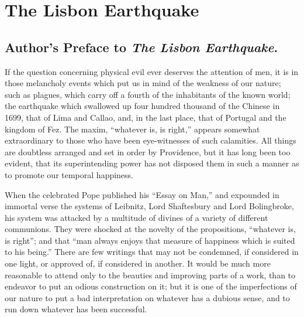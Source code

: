 
\author{Voltaire}
\chapter{The Lisbon Earthquake}

\section*{Author's Preface to \emph{The Lisbon Earthquake}.}

If the question concerning physical evil ever deserves the attention
of men, it is in those melancholy events which put us in mind of the
weakness of our nature; such as plagues, which carry off a fourth of
the inhabitants of the known world; the earthquake which swallowed up
four hundred thousand of the Chinese in 1699, that of Lima and Callao,
and, in the last place, that of Portugal and the kingdom of Fez. The
maxim, ``whatever is, is right,'' appears somewhat extraordinary to
those who have been eye-witnesses of such calamities. All things are
doubtless arranged and set in order by Providence, but it has long
been too evident, that its superintending power has not disposed them
in such a manner as to promote our temporal happiness.

When the celebrated Pope published his ``Essay on Man,'' and expounded
in immortal verse the systems of Leibnitz, Lord Shaftesbury and Lord
Bolingbroke, his system was attacked by a multitude of divines of a
variety of different communions. They were shocked at the novelty of
the propositions, ``whatever is, is right''; and that ``man always
enjoys that measure of happiness which is suited to his being.'' There
are few writings that may not be condemned, if considered in one
light, or approved of, if considered in another. It would be much more
reasonable to attend only to the beauties and improving parts of a
work, than to endeavor to put an odious construction on it; but it is
one of the imperfections of our nature to put a bad interpretation on
whatever has a dubious sense, and to run down whatever has been
successful.

